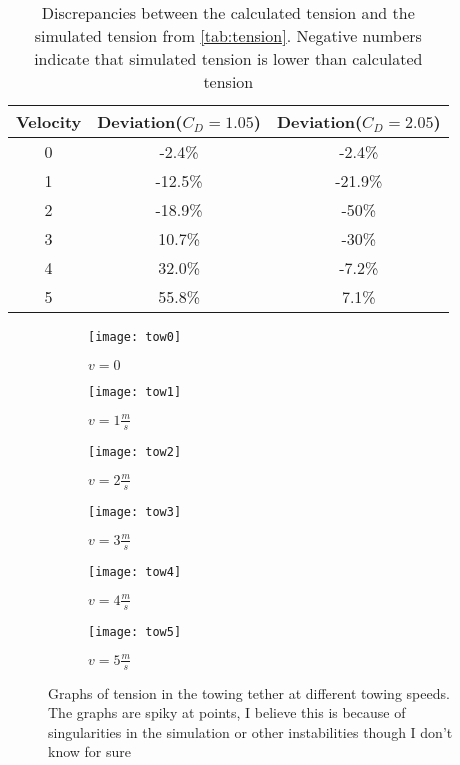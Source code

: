 \begin{table}
\begin{tabular}{c c c}
Velocity & Deviation(\(C_D=1.05\)) & Deviation(\(C_D=2.05\)) \\
\hline
0 & -2.4\% & -2.4\% \\
1 & -12.5\% & -21.9\% \\
2 & -18.9\% & -50\% \\
3 & 10.7\% & -30\% \\
4 & 32.0\% & -7.2\% \\
5 & 55.8\% & 7.1\%
\end{tabular}
\caption{Discrepancies between the calculated tension and the simulated tension from \cref{tab:tension}. Negative numbers indicate that simulated tension is lower than calculated tension}
\label{tab:deviation}
\end{table}

\begin{figure}
	\centering
	\begin{subfigure}[b]{0.45\textwidth}
		\centering
		\texttt{[image: tow0]}
		\caption{\(v=0\)}
	\end{subfigure}
	\hfill
	\begin{subfigure}[b]{0.45\textwidth}
		\centering
		\texttt{[image: tow1]}
		\caption{\(v=1\frac{m}{s}\)}
	\end{subfigure}
	\vfill
	\begin{subfigure}[b]{0.45\textwidth}
		\centering
		\texttt{[image: tow2]}
		\caption{\(v=2\frac{m}{s}\)}
	\end{subfigure}
	\hfill
	\begin{subfigure}[b]{0.45\textwidth}
		\centering
		\texttt{[image: tow3]}
		\caption{\(v=3\frac{m}{s}\)}
	\end{subfigure}
	\vfill
	\begin{subfigure}[b]{0.45\textwidth}
		\centering
		\texttt{[image: tow4]}
		\caption{\(v=4\frac{m}{s}\)}
	\end{subfigure}
	\hfill
	\begin{subfigure}[b]{0.45\textwidth}
		\centering
		\texttt{[image: tow5]}
		\caption{\(v=5\frac{m}{s}\)}
	\end{subfigure}
	\caption{Graphs of tension in the towing tether at different towing speeds. The graphs are spiky at points, I believe this is because of singularities in the simulation or other instabilities though I don't know for sure}
	\label{fig:tensions}
\end{figure}

